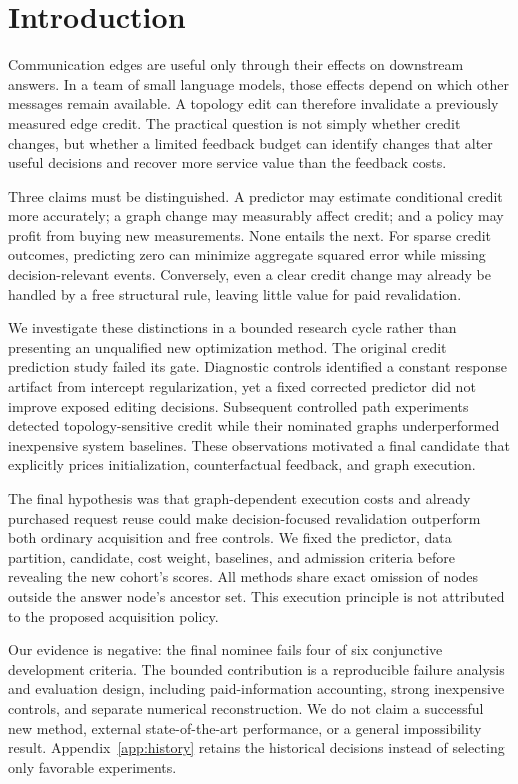 \section{Introduction}
Communication edges are useful only through their effects on downstream
answers. In a team of small language models, those effects depend on which
other messages remain available. A topology edit can therefore invalidate
a previously measured edge credit. The practical question is not simply
whether credit changes, but whether a limited feedback budget can identify
changes that alter useful decisions and recover more service value than
the feedback costs.

Three claims must be distinguished. A predictor may estimate conditional
credit more accurately; a graph change may measurably affect credit; and a
policy may profit from buying new measurements. None entails the next.
For sparse credit outcomes, predicting zero can minimize aggregate squared
error while missing decision-relevant events. Conversely, even a clear
credit change may already be handled by a free structural rule, leaving
little value for paid revalidation.

We investigate these distinctions in a bounded research cycle rather than
presenting an unqualified new optimization method. The original credit
prediction study failed its gate. Diagnostic controls identified a constant
response artifact from intercept regularization, yet a fixed corrected
predictor did not improve exposed editing decisions. Subsequent controlled
path experiments detected topology-sensitive credit while their nominated
graphs underperformed inexpensive system baselines. These observations
motivated a final candidate that explicitly prices initialization,
counterfactual feedback, and graph execution.

The final hypothesis was that graph-dependent execution costs and already
purchased request reuse could make decision-focused revalidation outperform
both ordinary acquisition and free controls. We fixed the predictor, data
partition, candidate, cost weight, baselines, and admission criteria before
revealing the new cohort's scores. All methods share exact omission of
nodes outside the answer node's ancestor set. This execution principle is
not attributed to the proposed acquisition policy.

Our evidence is negative: the final nominee fails four of six conjunctive
development criteria. The bounded contribution is a reproducible failure
analysis and evaluation design, including paid-information accounting,
strong inexpensive controls, and separate numerical reconstruction. We do
not claim a successful new method, external state-of-the-art performance,
or a general impossibility result. Appendix~\ref{app:history} retains the
historical decisions instead of selecting only favorable experiments.
